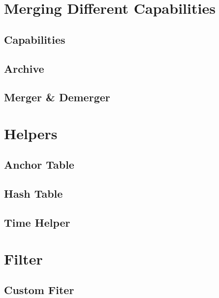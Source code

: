 \section{Merging Different Capabilities}
\subsection{Capabilities}
\subsection{Archive}
\subsection{Merger \& Demerger}
\section{Helpers}
\subsection{Anchor Table}
\subsection{Hash Table}
\subsection{Time Helper}
\section{Filter}
\subsection{Custom Fiter}
